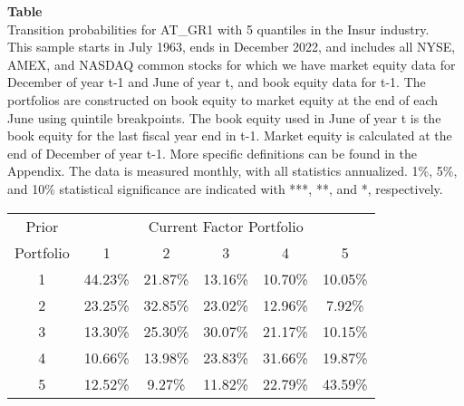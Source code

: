 \begin{table*}[ht!]
\raggedright
{}
\label{tab: transition_probs_AT_GR1_Insur_with_5_quantiles}
\textbf{Table \thetable} \\
Transition probabilities for AT_GR1 with 5 quantiles in the Insur industry. \\
\hspace*{1em}This sample starts in July 1963, ends in December 2022, and includes all NYSE, AMEX, and NASDAQ common stocks for which we have market equity data for December of year t-1 and June of year t, and book equity data for t-1. The portfolios are constructed on book equity to market equity at the end of each June using quintile breakpoints.  The book equity used in June of year t is the book equity for the last fiscal year end in t-1.  Market equity is calculated at the end of December of year t-1.  More specific definitions can be found in the Appendix.  The data is measured monthly, with all statistics annualized.  1\%, 5\%, and 10\% statistical significance are indicated with ***, **, and *, respectively. \\
\vspace{0.5em}
\centering
\begin{adjustbox}{max width=\textwidth}
\begin{tabular}{@{}cccccc@{}}
\toprule
Prior & \multicolumn{5}{c}{Current Factor Portfolio} \\
Portfolio & 1 & 2 & 3 & 4 & 5 \\
\midrule
1 & 44.23\% & 21.87\% & 13.16\% & 10.70\% & 10.05\% \\
2 & 23.25\% & 32.85\% & 23.02\% & 12.96\% & 7.92\% \\
3 & 13.30\% & 25.30\% & 30.07\% & 21.17\% & 10.15\% \\
4 & 10.66\% & 13.98\% & 23.83\% & 31.66\% & 19.87\% \\
5 & 12.52\% & 9.27\% & 11.82\% & 22.79\% & 43.59\% \\
\bottomrule
\end{tabular}
\end{adjustbox}
\end{table*}